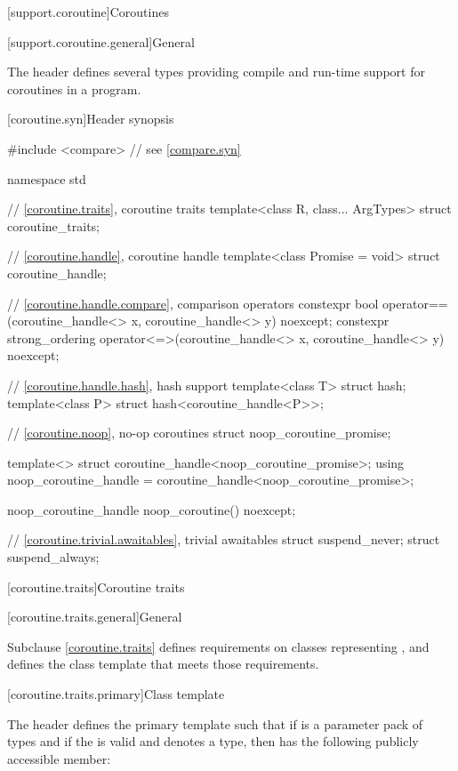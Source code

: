 [support.coroutine]{Coroutines}

[support.coroutine.general]{General}

\pnum
The header 
defines several types providing
compile and run-time support for
coroutines in a \Cpp{} program.

[coroutine.syn]{Header  synopsis}

%
%
\begin{codeblock}
#include <compare>              // see \ref{compare.syn}

namespace std {
  // \ref{coroutine.traits}, coroutine traits
  template<class R, class... ArgTypes>
    struct coroutine_traits;

  // \ref{coroutine.handle}, coroutine handle
  template<class Promise = void>
    struct coroutine_handle;

  // \ref{coroutine.handle.compare}, comparison operators
  constexpr bool operator==(coroutine_handle<> x, coroutine_handle<> y) noexcept;
  constexpr strong_ordering operator<=>(coroutine_handle<> x, coroutine_handle<> y) noexcept;

  // \ref{coroutine.handle.hash}, hash support
  template<class T> struct hash;
  template<class P> struct hash<coroutine_handle<P>>;

  // \ref{coroutine.noop}, no-op coroutines
  struct noop_coroutine_promise;

  template<> struct coroutine_handle<noop_coroutine_promise>;
  using noop_coroutine_handle = coroutine_handle<noop_coroutine_promise>;

  noop_coroutine_handle noop_coroutine() noexcept;

  // \ref{coroutine.trivial.awaitables}, trivial awaitables
  struct suspend_never;
  struct suspend_always;
}
\end{codeblock}

[coroutine.traits]{Coroutine traits}

[coroutine.traits.general]{General}

\pnum
Subclause \ref{coroutine.traits} defines requirements on classes representing
,
and defines the class template
that meets those requirements.

[coroutine.traits.primary]{Class template }

\pnum
The header  defines the primary template
 such that
if  is a parameter pack of types and
if the   is valid and
denotes a type,
then  has the following publicly
accessible member:

